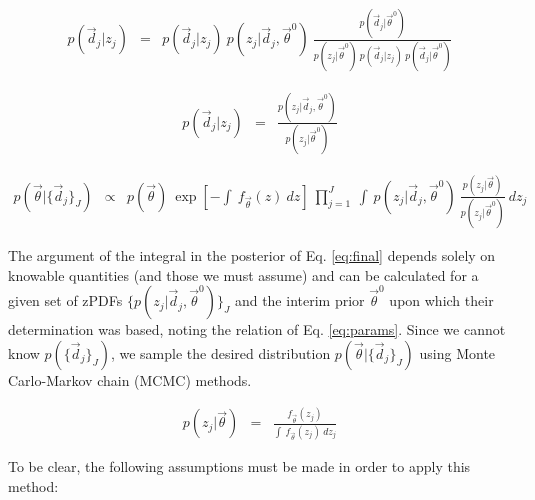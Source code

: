 \documentclass[preprint]{aastex}
\begin{document}
\begin{eqnarray}
\label{eq:indterm}
p(\vec{d}_{j}|z_{j}) &=& p(\vec{d}_{j}|z_{j})\ p(z_{j}|\vec{d}_{j},\vec{\theta}^{0})\ \frac{p(\vec{d}_{j}|\vec{\theta}^{0})}{p(z_{j}|\vec{\theta}^{0})\ p(\vec{d}_{j}|z_{j})\ p(\vec{d}_{j}|\vec{\theta}^{0})}
\end{eqnarray}

\begin{eqnarray}
\label{eq:cancel}
p(\vec{d}_{j}|z_{j}) &=& \frac{p(z_{j}|\vec{d}_{j},\vec{\theta}^{0})}{p(z_{j}|\vec{\theta}^{0})}
\end{eqnarray}

\begin{eqnarray}
\label{eq:final}
p(\vec{\theta}|\{\vec{d}_{j}\}_{J}) &\propto& p(\vec{\theta})\ \exp\left[-\int\ f_{\vec{\theta}}(z)\ dz\right]\ \prod_{j=1}^{J}\ \int\ p(z_{j}|\vec{d}_{j},\vec{\theta}^{0})\ \frac{p(z_{j}|\vec{\theta})}{p(z_{j}|\vec{\theta}^{0})}\ dz_{j}
\end{eqnarray}

The argument of the integral in the posterior of Eq. \ref{eq:final} depends solely on knowable quantities (and those we must assume) and can be calculated for a given set of zPDFs $\{p(z_{j}|\vec{d}_{j},\vec{\theta}^{0})\}_{J}$ and the interim prior $\vec{\theta}^{0}$ upon which their determination was based, noting the relation of Eq. \ref{eq:params}.  Since we cannot know $p(\{\vec{d}_{j}\}_{J})$, we sample the desired distribution $p(\vec{\theta}|\{\vec{d}_{j}\}_{J})$ using Monte Carlo-Markov chain (MCMC) methods.  

\begin{eqnarray}
\label{eq:params}
p(z_{j}|\vec{\theta}) &=& \frac{f_{\vec{\theta}}(z_{j})}{\int\ f_{\vec{\theta}}(z_{j})\ dz_{j}}
\end{eqnarray}

To be clear, the following assumptions must be made in order to apply this method:
\end{document}
